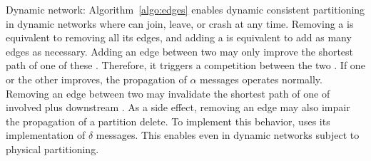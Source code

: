 \begin{asparadesc}
\item [Dynamic network:] Algorithm~\ref{algo:edges} enables dynamic
  consistent partitioning in dynamic networks where \processes can
  join, leave, or crash at any time. Removing a \process is equivalent
  to removing all its edges, and adding a \process is equivalent to
  add as many edges as necessary.  Adding an edge between two
  \processes may only improve the shortest path of one of these
  \processes. Therefore, it triggers a competition between the two
  \processes. If one or the other \process improves, the propagation
  of $\alpha$ messages operates normally.  Removing an edge between
  two \processes may invalidate the shortest path of one of involved
  \processes plus downstream \processes. As a side effect, removing an
  edge may also impair the propagation of a partition delete. To
  implement this behavior, \NAME uses its implementation of $\delta$
  messages. This enables \NAME even in dynamic networks subject to
  physical partitioning.
\end{asparadesc}

